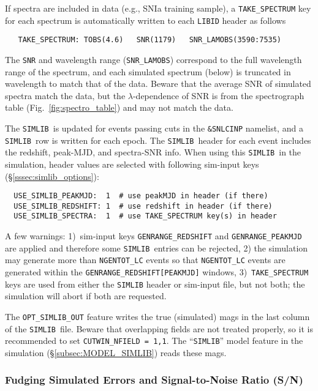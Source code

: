 \documentclass[12pt]{article}
\newcommand{\simlib}{{\tt SIMLIB}}
\begin{document}
If spectra are included in data (e.g., SNIa training sample), 
a {\tt TAKE\_SPECTRUM} key for each spectrum is automatically written
to each {\tt LIBID} header as follows
\begin{verbatim}
   TAKE_SPECTRUM: TOBS(4.6)   SNR(1179)   SNR_LAMOBS(3590:7535)
\end{verbatim}
The {\tt SNR} and wavelength range ({\tt SNR\_LAMOBS})
correspond to the full wavelength range of the spectrum,
and each simulated spectrum (below) is truncated in wavelength
to match that of the data. Beware that the average SNR
of simulated spectra match the data, but the $\lambda$-dependence
of SNR is from the spectrograph table (Fig.~\ref{fig:spectro_table})
and may not match the data.


The \simlib\ is updated for events passing cuts in the 
{\tt \&SNLCINP} namelist, and a \simlib\ row is written
for each epoch.  The \simlib\ header for each event
includes the redshift, peak-MJD, and spectra-SNR info. 
When using this \simlib\ in the simulation, 
header values are selected with following sim-input keys
(\S\ref{sssec:simlib_options}):
\begin{verbatim}
  USE_SIMLIB_PEAKMJD:  1  # use peakMJD in header (if there)
  USE_SIMLIB_REDSHIFT: 1  # use redshift in header (if there)
  USE_SIMLIB_SPECTRA:  1  # use TAKE_SPECTRUM key(s) in header
\end{verbatim}

A few warnings: 
1)~sim-input keys {\tt GENRANGE\_REDSHIFT} and {\tt GENRANGE\_PEAKMJD}
are applied and therefore some \simlib\ entries can be rejected,
2) the simulation may generate more than {\tt NGENTOT\_LC} 
events so that {\tt NGENTOT\_LC} events are generated
within the {\tt GENRANGE\_REDSHIFT[PEAKMJD]} windows,
3)~{\tt TAKE\_SPECTRUM} keys are used from either
the {\tt SIMLIB} header or sim-input file, but not both;
the simulation will abort if both are requested.

The {\tt OPT\_SIMLIB\_OUT} feature writes the true (simulated) mags in the
last column of the \simlib\ file.
Beware that overlapping fields are not treated properly, 
so it is recommended to set {\tt CUTWIN\_NFIELD = 1,1}.
The ``{\simlib}'' model feature in the simulation 
(\S\ref{subsec:MODEL_SIMLIB}) reads these mags.

  \clearpage
  \subsubsection{Fudging Simulated Errors and Signal-to-Noise Ratio (S/N) }
  \label{sss:fudge_sim_errors}
\end{document}
